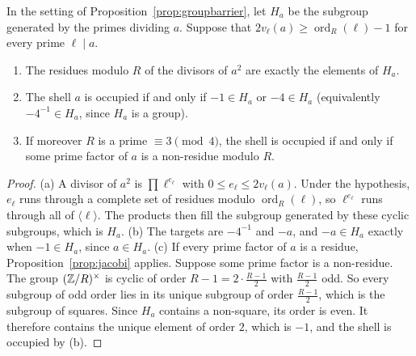 \begin{proposition}\label{prop:groupconverse}
In the setting of Proposition~\ref{prop:groupbarrier}, let $H_a$ be the subgroup generated by the primes dividing $a$. Suppose that $2v_\ell(a)\ge\operatorname{ord}_R(\ell)-1$ for every prime $\ell\mid a$.
\begin{enumerate}[label=(\alph*)]
\item The residues modulo $R$ of the divisors of $a^2$ are exactly the elements of $H_a$.
\item The shell $a$ is occupied if and only if $-1\in H_a$ or $-4\in H_a$ (equivalently $-4^{-1}\in H_a$, since $H_a$ is a group).
\item If moreover $R$ is a prime $\equiv3\pmod4$, the shell is occupied if and only if some prime factor of $a$ is a non-residue modulo $R$.
\end{enumerate}
\end{proposition}
\begin{proof}
(a) A divisor of $a^2$ is $\prod\ell^{e_\ell}$ with $0\le e_\ell\le2v_\ell(a)$. Under the hypothesis, $e_\ell$ runs through a complete set of residues modulo $\operatorname{ord}_R(\ell)$, so $\ell^{e_\ell}$ runs through all of $\langle\ell\rangle$. The products then fill the subgroup generated by these cyclic subgroups, which is $H_a$.
(b) The targets are $-4^{-1}$ and $-a$, and $-a\in H_a$ exactly when $-1\in H_a$, since $a\in H_a$.
(c) If every prime factor of $a$ is a residue, Proposition~\ref{prop:jacobi} applies. Suppose some prime factor is a non-residue. The group $(\mathbb{Z}/R)^\times$ is cyclic of order $R-1=2\cdot\frac{R-1}2$ with $\frac{R-1}2$ odd. So every subgroup of odd order lies in its unique subgroup of order $\frac{R-1}2$, which is the subgroup of squares. Since $H_a$ contains a non-square, its order is even. It therefore contains the unique element of order $2$, which is $-1$, and the shell is occupied by (b).
\end{proof}
